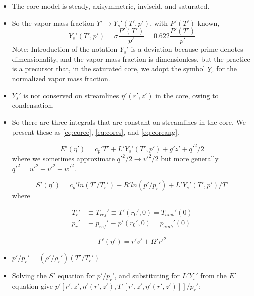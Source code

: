 \documentclass[preprint, prX]{revtex4}
\begin{document}
\begin{itemize}
\item The core model is steady, axisymmetric, inviscid, and saturated.

\item So the vapor mass fraction $Y' \rightarrow Y_s'(T',p')$, with $P'(T')$ known,
\begin{equation}
	Y_s'(T',p') = \sigma \frac{P'(T')}{p'} = 0.622 \frac{P'(T')}{p'}
\end{equation}
Note: Introduction of the notation $Y_s'$ is a deviation because prime denotes dimensionality, and the vapor mass fraction is dimensionless, but the practice is a precursor that, in the saturated core, we adopt the symbol $\widetilde{Y}_s$ for the normalized vapor mass fraction.

\item $Y_s'$ is not conserved on streamlines $\eta'(r',z')$ in the core, owing to condensation.

\item So there are three integrals that are constant on streamlines in the core. We present these as \eqref{eq:coree}, \eqref{eq:cores}, and \eqref{eq:coreang}.

\begin{equation}
E'(\eta') = c_p' T' + L' Y_s'(T',p') + g'z' + q'^2/2
\label{eq:coree}
\end{equation}
where we sometimes approximate $q'^2/2 \rightarrow v'^2/2$ but more generally $q'^2 = u'^2 + v'^2 + w'^2$.

\begin{equation}
	S'(\eta') = c_p' ln(T' / T_r') - R' ln(p'/p_r') + L'Y_s'(T',p')/T'
	\label{eq:cores}
\end{equation}
where

\begin{equation}
\begin{split}
	T_r' & \equiv T_{ref}' \equiv T'(r_0', 0) = T_{amb}'(0) \\
	p_r' & \equiv p_{ref}' \equiv p'(r_0', 0) = p_{amb}'(0)
\end{split}	
\end{equation}

\begin{equation}
	\Gamma'(\eta') = r' v' + \Omega'r'^2
	\label{eq:coreang}
\end{equation}

\item $p'/p_r' = (\rho'/ \rho_r')(T'/T_r')$

\item Solving the $S'$ equation for $p'/p_r'$, and substituting for $L'Y_s'$ from the $E'$ equation give $p'\left[r',z',\eta'(r',z'), T'[r',z',\eta'(r',z')] \right]/p_r'$:


\end{itemize}
\end{document}
